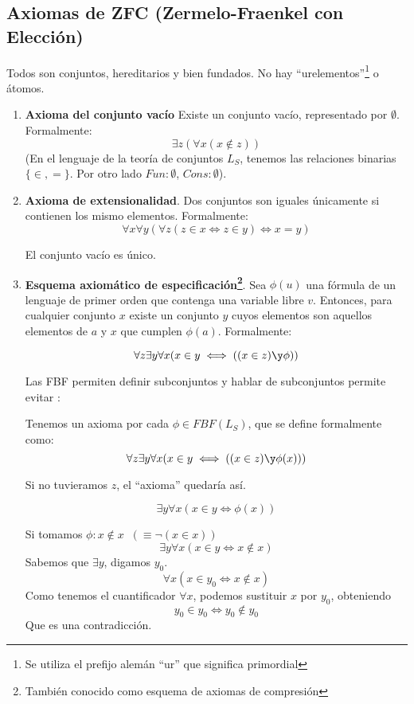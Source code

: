 \subsection{Axiomas de ZFC (Zermelo-Fraenkel con Elección)}
	Todos son conjuntos, hereditarios y bien fundados.
	No hay ``urelementos''\footnote{Se utiliza el prefijo alemán ``ur'' que significa primordial} o átomos.
	\begin{enumerate}
		\item \textbf{Axioma del conjunto vacío} Existe un conjunto vacío, representado por $\emptyset$. Formalmente:
		$$\exists z (\forall x (x\notin z))$$
		(En el lenguaje de la teoría de conjuntos $L_S$, tenemos las relaciones binarias $\{\in, =\}$. Por otro lado $Fun: \emptyset$, $Cons: \emptyset$).

		\item \textbf{Axioma de extensionalidad}.
		Dos conjuntos son iguales únicamente si contienen los mismo elementos. Formalmente:
		$$\forall x\forall y(\forall z (z\in x\iff z\in y)\iff x = y)$$
		\begin{corol}
			El conjunto vacío es único.
		\end{corol}

		\item \textbf{Esquema axiomático de especificación\footnote{También conocido como esquema de axiomas de compresión}}. Sea $\phi(u)$ una fórmula de un lenguaje de primer orden que contenga una variable libre $v$. Entonces, para cualquier conjunto $x$ existe un conjunto $y$ cuyos elementos son aquellos elementos de $a$ y $x$ que cumplen $\phi(a)$. Formalmente:

		\[\forall z \exists y \forall x(x\in y\iff((x\in z)\y \phi))\]

		Las FBF permiten definir subconjuntos y hablar de subconjuntos permite evitar :

		Tenemos un axioma por cada $\phi\in FBF(L_S)$, que se define formalmente como:
		$$\forall z \exists y \forall x(x\in y\iff((x\in z)\y \phi(x)))$$

		Si no tuvieramos $z$, el ``axioma'' quedaría así.

		$$\exists y \forall x (x\in y\iff \phi(x))$$

		Si tomamos $\phi: x\notin x \;\; (\equiv\neg (x\in x))$
		$$\exists y \forall x (x\in y\iff x\notin x)$$
		Sabemos que $\exists y$, digamos $y_0$.
		$$\forall x (x\in y_0 \iff x\notin x)$$
		Como tenemos el cuantificador $\forall x$, podemos sustituir $x$ por $y_0$, obteniendo
		$$y_0\in y_0 \iff y_0\notin y_0$$
		Que es una contradicción.


\end{enumerate}
